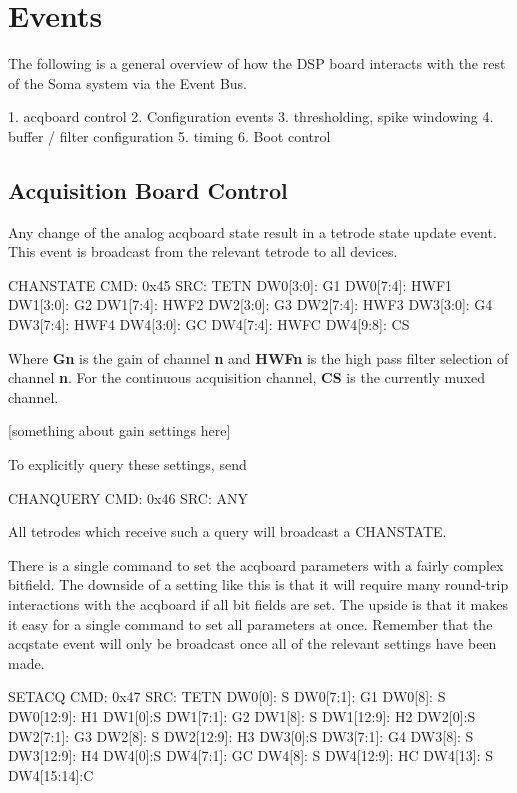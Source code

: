 \section{Events}
The following is a general overview of how the DSP board interacts with the rest of the Soma system via the Event Bus. 

1. acqboard control
2. Configuration events
3. thresholding, spike windowing
4. buffer / filter configuration
5. timing 
6. Boot control

\subsection{Acquisition Board Control}
Any change of the analog acqboard state result in a tetrode state update event. This event is broadcast from the relevant tetrode to all devices. 

\begin{event}{CHANSTATE}
CMD: 0x45
SRC: TETN
DW0[3:0]: G1
DW0[7:4]: HWF1
DW1[3:0]: G2
DW1[7:4]: HWF2
DW2[3:0]: G3
DW2[7:4]: HWF3
DW3[3:0]: G4
DW3[7:4]: HWF4
DW4[3:0]: GC
DW4[7:4]: HWFC
DW4[9:8]: CS
\end{event}


Where \textbf{Gn} is the gain of channel \textbf{n} and \textbf{HWFn} is the high pass filter selection of channel \textbf{n}. For the continuous acquisition channel, \textbf{CS} is the currently muxed channel. 

[something about gain settings here] 

To explicitly query these settings, send 

\begin{event}{CHANQUERY}
CMD: 0x46
SRC: ANY
\end{event}

All tetrodes which receive such a query will broadcast a CHANSTATE. 

There is a single command to set the acqboard parameters with a fairly complex bitfield. The downside of a setting like this is that it will require many round-trip interactions with the acqboard if all bit fields are set. The upside is that it makes it easy for a single command to set all parameters at once. Remember that the acqstate event will only be broadcast once all of the relevant settings have been made. 


\begin{event}{SETACQ}
CMD: 0x47
SRC: TETN
DW0[0]: S
DW0[7:1]: G1
DW0[8]: S
DW0[12:9]: H1
DW1[0]:S
DW1[7:1]: G2
DW1[8]: S
DW1[12:9]: H2
DW2[0]:S
DW2[7:1]: G3
DW2[8]: S
DW2[12:9]: H3
DW3[0]:S
DW3[7:1]: G4
DW3[8]: S
DW3[12:9]: H4
DW4[0]:S
DW4[7:1]: GC
DW4[8]: S
DW4[12:9]: HC
DW4[13]: S
DW4[15:14]:C
\end{event}


